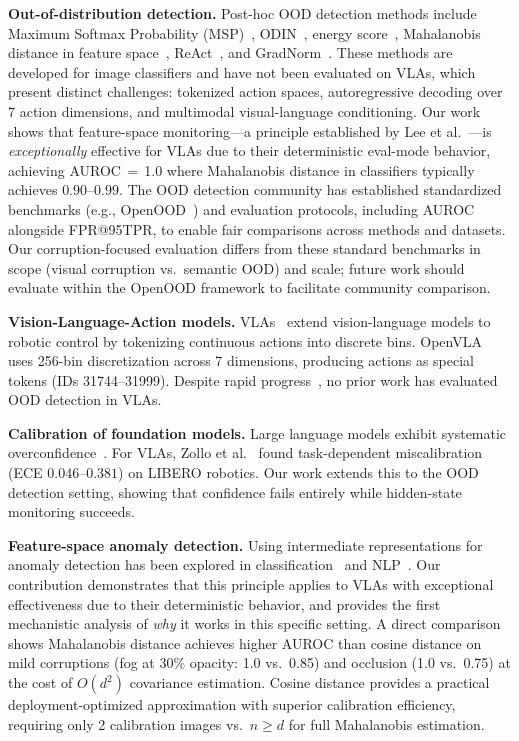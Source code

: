 \documentclass[11pt]{article}
\begin{document}
\textbf{Out-of-distribution detection.}
Post-hoc OOD detection methods include Maximum Softmax Probability (MSP)~\cite{hendrycks2017baseline}, ODIN~\cite{liang2018enhancing}, energy score~\cite{liu2020energy}, Mahalanobis distance in feature space~\cite{lee2018mahalanobis}, ReAct~\cite{sun2021react}, and GradNorm~\cite{huang2021importance}.
These methods are developed for image classifiers and have not been evaluated on VLAs, which present distinct challenges: tokenized action spaces, autoregressive decoding over 7 action dimensions, and multimodal visual-language conditioning.
Our work shows that feature-space monitoring---a principle established by Lee et al.~\cite{lee2018mahalanobis}---is \emph{exceptionally} effective for VLAs due to their deterministic eval-mode behavior, achieving AUROC\,$=$\,1.0 where Mahalanobis distance in classifiers typically achieves $0.90\text{--}0.99$.
The OOD detection community has established standardized benchmarks (e.g., OpenOOD~\cite{zhang2023openood}) and evaluation protocols, including AUROC alongside FPR@95TPR, to enable fair comparisons across methods and datasets.
Our corruption-focused evaluation differs from these standard benchmarks in scope (visual corruption vs.\ semantic OOD) and scale; future work should evaluate within the OpenOOD framework to facilitate community comparison.

\textbf{Vision-Language-Action models.}
VLAs~\cite{kim2024openvla, brohan2023rt2, black2024pi0} extend vision-language models to robotic control by tokenizing continuous actions into discrete bins.
OpenVLA~\cite{kim2024openvla} uses 256-bin discretization across 7 dimensions, producing actions as special tokens (IDs 31744--31999).
Despite rapid progress~\cite{tian2024drivevlm, chen2024autovala, sima2025alpamayo, latentvla2025}, no prior work has evaluated OOD detection in VLAs.

\textbf{Calibration of foundation models.}
Large language models exhibit systematic overconfidence~\cite{kadavath2022language, tian2023just}.
For VLAs, Zollo et al.~\cite{zollo2025calibration} found task-dependent miscalibration (ECE $0.046\text{--}0.381$) on LIBERO robotics.
Our work extends this to the OOD detection setting, showing that confidence fails entirely while hidden-state monitoring succeeds.

\textbf{Feature-space anomaly detection.}
Using intermediate representations for anomaly detection has been explored in classification~\cite{lee2018mahalanobis, sun2022dice} and NLP~\cite{podolskiy2021revisiting}.
Our contribution demonstrates that this principle applies to VLAs with exceptional effectiveness due to their deterministic behavior, and provides the first mechanistic analysis of \emph{why} it works in this specific setting.
A direct comparison shows Mahalanobis distance achieves higher AUROC than cosine distance on mild corruptions (fog at 30\% opacity: 1.0 vs.\ 0.85) and occlusion (1.0 vs.\ 0.75) at the cost of $O(d^2)$ covariance estimation.
Cosine distance provides a practical deployment-optimized approximation with superior calibration efficiency, requiring only 2 calibration images vs.\ $n \geq d$ for full Mahalanobis estimation.
\end{document}
